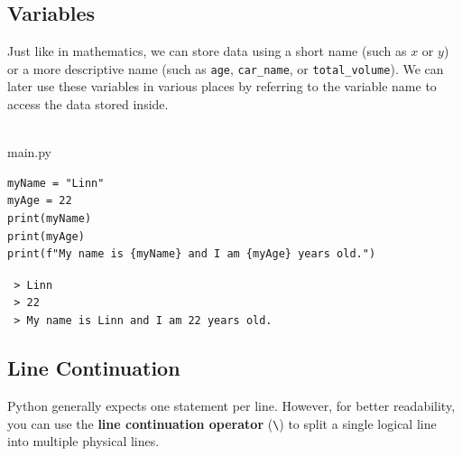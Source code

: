 \documentclass{report}
\begin{document}
\subsection{Variables}
Just like in mathematics, we can store data using a short name (such as $x$ or $y$) or a more descriptive name (such as \texttt{age}, \texttt{car\_name}, or \texttt{total\_volume}). We can later use these variables in various places by referring to the variable name to access the data stored inside.
\\\\


\begin{vscode}{main.py}
\begin{lstlisting}[style=vscodeStyle]
myName = "Linn"
myAge = 22
print(myName)
print(myAge)
print(f"My name is {myName} and I am {myAge} years old.")
\end{lstlisting}
\end{vscode}

\begin{terminal}
\texttt{\color{terminalFont} > Linn}\\
\texttt{\color{terminalFont} > 22}\\
\texttt{\color{terminalFont} > My name is Linn and I am 22 years old.}\\
\end{terminal}

\subsection{Line Continuation}
Python generally expects one statement per line. However, for better readability, you can use the \textbf{line continuation operator} (\texttt{\textbackslash}) to split a single logical line into multiple physical lines.
\\\\ 
\end{document}
